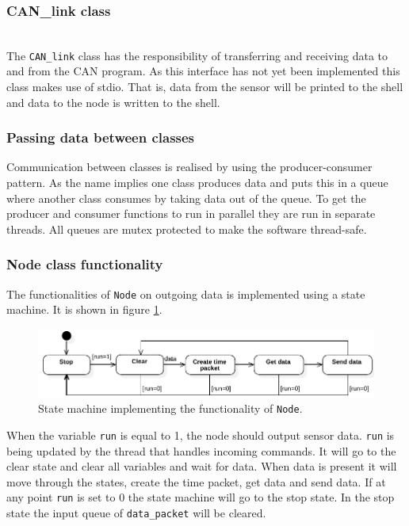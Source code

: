 \subsubsection*{CAN\_link class} ~ \\
The \texttt{CAN\_link} class has the responsibility of transferring and receiving data to and from the CAN program.
As this interface has not yet been implemented this class makes use of stdio. 
That is, data from the sensor will be printed to the shell and data to the node is written to the shell. 
\subsubsection*{Passing data between classes}
Communication between classes is realised by using the producer-consumer pattern.
As the name implies one class produces data and puts this in a queue where another class consumes by taking data out of the queue.
To get the producer and consumer functions to run in parallel they are run in separate threads.
All queues are mutex protected to make the software thread-safe.

\subsubsection*{Node class functionality}
The functionalities of \texttt{Node} on outgoing data is implemented using a state machine.
It is shown in figure \ref{fig:state_machine}.
\begin{figure}[!h]
\centering
\includegraphics[width=1\textwidth]{graphics/StateDiagram_Node.pdf}
\caption{State machine implementing the functionality of \texttt{Node}. }
\label{fig:state_machine}
\end{figure}
When the variable \texttt{run} is equal to 1, the node should output sensor data.
\texttt{run} is being updated by the thread that handles incoming commands.
It will go to the clear state and clear all variables and wait for data. 
When data is present it will move through the states, create the time packet, get data and send data. 
If at any point \texttt{run} is set to 0 the state machine will go to the stop state.
In the stop state the input queue of \texttt{data\_packet} will be cleared.


